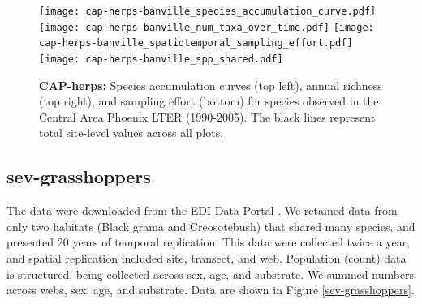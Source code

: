 \documentclass[11pt, oneside]{article}
\begin{document}
\begin{figure}[h!]
\centering
\texttt{[image: cap-herps-banville\_species\_accumulation\_curve.pdf]}
\texttt{[image: cap-herps-banville\_num\_taxa\_over\_time.pdf]}
\texttt{[image: cap-herps-banville\_spatiotemporal\_sampling\_effort.pdf]}
\texttt{[image: cap-herps-banville\_spp\_shared.pdf]}
\caption{{\bf CAP-herps:} Species accumulation curves (top left),  annual richness (top right), and sampling effort (bottom)  for species observed in the Central Area Phoenix LTER (1990-2005). The black lines represent total site-level values across all plots.}
\label{cap-herps}
\end{figure}



\subsection {sev-grasshoppers}
The data were downloaded from the EDI Data Portal \citep{sev-grasshopper}.
We retained data from only two habitats (Black grama and Creosotebush) that shared many species, and presented 20 years of temporal replication. This data were collected twice a year, and spatial replication included site, transect, and web. 
Population (count) data is structured, being collected across sex, age, and substrate. 
We summed numbers across webs, sex, age, and substrate.
Data are shown in Figure \ref{sev-grasshoppers}.
  
\end{document}
